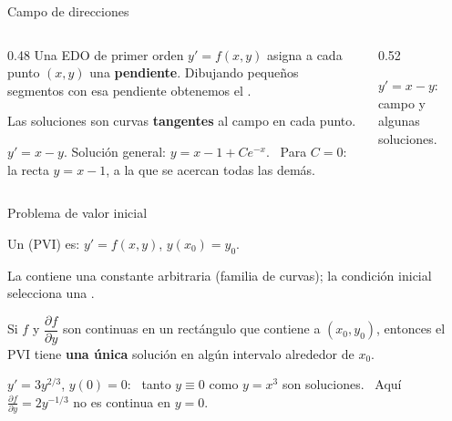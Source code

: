 \documentclass[10pt,aspectratio=169]{beamer}
\begin{document}
\begin{frame}{Campo de direcciones}
  \begin{columns}
    \begin{column}{0.48\textwidth}
      Una EDO de primer orden $y'=f(x,y)$ asigna a cada punto $(x,y)$ una \textbf{pendiente}. Dibujando pequeños segmentos con esa
      pendiente obtenemos el .
      \medskip

      Las soluciones son curvas \textbf{tangentes} al campo en cada punto.
      \begin{ejemplo}
        $y'=x-y$. Solución general: $y=x-1+Ce^{-x}$. \ Para $C=0$: la recta $y=x-1$, a la que se acercan todas las demás.
      \end{ejemplo}
    \end{column}
    \begin{column}{0.52\textwidth}
      \centering

      \small $y'=x-y$: campo y algunas soluciones.
    \end{column}
  \end{columns}
\end{frame}

\begin{frame}{Problema de valor inicial}
  \begin{definicion}
    Un  (PVI) es: \quad $y'=f(x,y)$, \quad $y(x_0)=y_0$.
  \end{definicion}
  La  contiene una constante arbitraria (familia de curvas); la condición inicial selecciona una
  .
  \begin{teorema}
    Si $f$ y $\dfrac{\partial f}{\partial y}$ son continuas en un rectángulo que contiene a $(x_0,y_0)$, entonces el PVI tiene
    \textbf{una única} solución en algún intervalo alrededor de $x_0$.
  \end{teorema}
  \begin{ejemplo}
    $y'=3y^{2/3}$, $y(0)=0$: \ tanto $y\equiv0$ como $y=x^3$ son soluciones. \ Aquí $\frac{\partial f}{\partial y}=2y^{-1/3}$ no es continua en $y=0$.
  \end{ejemplo}
\end{frame}
\end{document}
